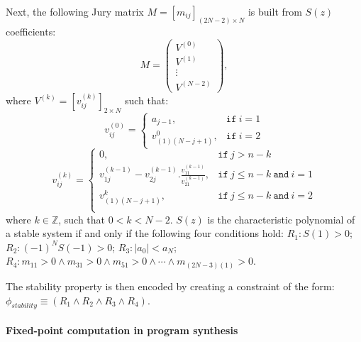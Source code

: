 \documentclass[final]{sig-alternate-05-2015}
\newcommand{\red}[1]{{\color{red}#1}}
\begin{document}
Next, the following Jury matrix
$M = [m_{ij}]_{(2N-2)\times N}$ is built from $S(z)$ coefficients:
%
$$
M=\left( 
\begin{array}{c}
V^{(0)}\\
V^{(1)}\\
\vdots\\
V^{(N-2)}
\end{array}
\right), 
$$
%
where $V^{(k)} = [v^{(k)}_{ij} ]_{2\times N}$ such that:
%
$$
v_{ij}^{(0)}=\left\{
\begin{array}{ll}
a_{j-1}, & \texttt{if}~i=1\\
v_{(1)(N-j+1)}^{0},&\texttt{if}~i=2
\end{array}
\right.
$$
%
$$
v_{ij}^{(k)}=\left\{
\begin{array}{ll}
0,&\texttt{if}~j>n-k\\
v_{1j}^{(k-1)}-v_{2j}^{(k-1)} . \frac{v_{11}^{(k-1)}}{v_{21}^{(k-1)}}, & \texttt{if}~j\leq n-k ~\texttt{and}~i=1\\
v_{(1)(N-j+1)}^{k},& \texttt{if}~j\leq n-k ~\texttt{and}~i=2\\
\end{array}
\right.
$$
%
where $k \in \mathbb{Z}$, such that $0 < k < N - 2$. 
$S(z)$ is the
characteristic polynomial of a stable system if and only if the following four conditions hold:
$R_1: S(1) > 0$;
$R_2: (−1)^N S(−1) > 0$;
$R_3: |a_0| < a_N$;
$R_4: m_{11} > 0 \wedge m_{31}>0 \wedge m_{51}>0 \wedge \cdots \wedge m_{(2N{-}3)(1)}>0$.

The stability property is then encoded by creating a
constraint of the form:
$
\phi_\mathit{stability} \equiv (R_1 \wedge R_2 \wedge R_3 \wedge R_4).
$


\paragraph{Fixed-point computation in program synthesis}
\end{document}
